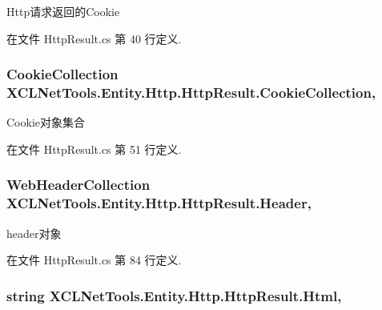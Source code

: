 Http请求返回的\-Cookie 



在文件 Http\-Result.\-cs 第 40 行定义.

\hypertarget{class_x_c_l_net_tools_1_1_entity_1_1_http_1_1_http_result_a30f5eb22081db0c17f2924ac0ee89156}{
\subsubsection[{Cookie\-Collection}]{\setlength{\rightskip}{0pt plus 5cm}Cookie\-Collection X\-C\-L\-Net\-Tools.\-Entity.\-Http.\-Http\-Result.\-Cookie\-Collection\hspace{0.3cm}{\ttfamily [get]}, {\ttfamily [set]}}}\label{class_x_c_l_net_tools_1_1_entity_1_1_http_1_1_http_result_a30f5eb22081db0c17f2924ac0ee89156}


Cookie对象集合 



在文件 Http\-Result.\-cs 第 51 行定义.

\hypertarget{class_x_c_l_net_tools_1_1_entity_1_1_http_1_1_http_result_af2f67a87b13cf52358900ff814f88f20}{
\subsubsection[{Header}]{\setlength{\rightskip}{0pt plus 5cm}Web\-Header\-Collection X\-C\-L\-Net\-Tools.\-Entity.\-Http.\-Http\-Result.\-Header\hspace{0.3cm}{\ttfamily [get]}, {\ttfamily [set]}}}\label{class_x_c_l_net_tools_1_1_entity_1_1_http_1_1_http_result_af2f67a87b13cf52358900ff814f88f20}


header对象 



在文件 Http\-Result.\-cs 第 84 行定义.

\hypertarget{class_x_c_l_net_tools_1_1_entity_1_1_http_1_1_http_result_a9fc43bbbeb2f24faeeab16785cd7c402}{
\subsubsection[{Html}]{\setlength{\rightskip}{0pt plus 5cm}string X\-C\-L\-Net\-Tools.\-Entity.\-Http.\-Http\-Result.\-Html\hspace{0.3cm}{\ttfamily [get]}, {\ttfamily [set]}}}\label{class_x_c_l_net_tools_1_1_entity_1_1_http_1_1_http_result_a9fc43bbbeb2f24faeeab16785cd7c402}


